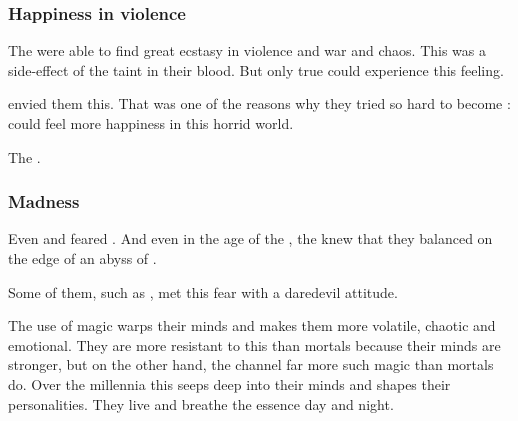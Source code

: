 \subsubsection{Happiness in violence}
The \dragons were able to find great ecstasy in violence and war and chaos.
This was a side-effect of the \xs taint in their blood.
But only true \dragons could experience this feeling.

\Caisith envied them this. 
That was one of the reasons why they tried so hard to become \dragons:
\Dragons could feel more happiness in this horrid world.

The \resphan \ketherain {}. 





\subsubsection{Madness}
Even \Sethicus and \Tiamat{} feared . 
And even in the age of the \thirdbanewar, the \dragons{} knew that they balanced on the edge of an abyss of . 



Some of them, such as \Ishnaruchaefir, met this fear with a  daredevil attitude. 

The \psp{\dragons}{} use of  magic warps their minds and makes them more volatile, chaotic and emotional. 
They are more resistant to this than mortals because their minds are stronger, but on the other hand, the \dragons{} channel far more such magic than mortals do. 
Over the millennia this seeps deep into their minds and shapes their personalities. 
They live and breathe the \xs{} essence day and night. 





